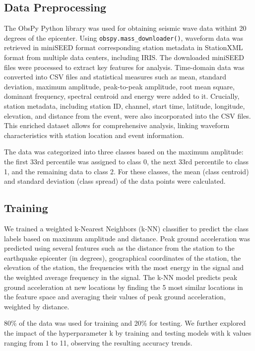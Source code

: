 \documentclass[conference]{IEEEtran}
\begin{document}
\subsection{Data Preprocessing}
\label{sec:orgdd4851c}
The ObsPy Python library was used for obtaining seismic wave data withint 20
degrees of the epicenter. Using \texttt{obspy.mass\_downloader()}, waveform data
was retrieved in miniSEED format corresponding station metadata in StationXML
format from multiple data centers, including IRIS. The downloaded miniSEED files
were processed to extract key features for analysis. Time-domain data was
converted into CSV files and statistical measures such as mean, standard
deviation, maximum amplitude, peak-to-peak amplitude, root mean square, dominant
frequency, spectral centroid and energy were added to it. Crucially, station
metadata, including station ID, channel, start time, latitude, longitude,
elevation, and distance from the event, were also incorporated into the CSV
files. This enriched dataset allows for comprehensive analysis, linking waveform
characteristics with station location and event information.

The data was categorized into three classes based on the maximum amplitude: the
first 33rd percentile was assigned to class 0, the next 33rd percentile to class
1, and the remaining data to class 2. For these classes, the mean (class
centroid) and standard deviation (class spread) of the data points were
calculated.
\subsection{Training}
\label{sec:orgb267510}
We trained a weighted k-Nearest Neighbors (k-NN) classifier to predict the class
labels based on maximum amplitude and distance. Peak ground acceleration was
predicted using several features such as the distance from the station to the
earthquake epicenter (in degrees), geographical coordinates of the station, the
elevation of the station, the frequencies with the most energy in the signal and
the weighted average frequency in the signal. The k-NN model predicts peak
ground acceleration at new locations by finding the 5 most similar locations in
the feature space and averaging their values of peak ground acceleration,
weighted by distance.

80\% of the data was used for training and 20\% for testing. We further explored
the impact of the hyperparameter k by training and testing models with k values
ranging from 1 to 11, observing the resulting accuracy trends.
\end{document}
